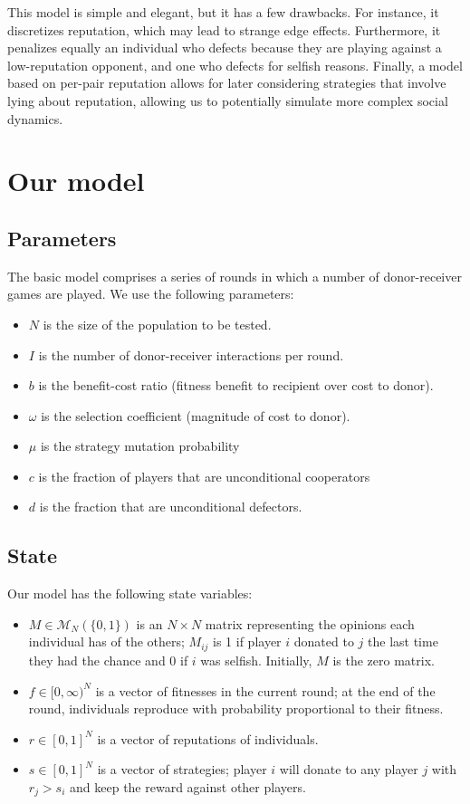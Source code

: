 \documentclass{amsart}
\begin{document}
This model is simple and elegant, but it has a few drawbacks. For
instance, it discretizes reputation, which may lead to strange edge
effects. Furthermore, it penalizes equally an individual who defects
because they are playing against a low-reputation opponent, and one
who defects for selfish reasons. Finally, a model based on per-pair
reputation allows for later considering strategies that involve lying
about reputation, allowing us to potentially simulate more complex
social dynamics.

\section{Our model}
\label{sec:model}

\subsection{Parameters}

The basic model comprises a series of rounds in which a number of
donor-receiver games are played. We use the following parameters:

\begin{itemize}
\item $N$ is the size of the population to be tested.
\item $I$ is the number of donor-receiver interactions per round.
\item $b$ is the benefit-cost ratio (fitness benefit to recipient over
  cost to donor).
\item $\omega$ is the selection coefficient (magnitude of cost to
  donor).
\item $\mu$ is the strategy mutation probability
\item $c$ is the fraction of players that are unconditional
  cooperators
\item $d$ is the fraction that are unconditional defectors.
\end{itemize}

\subsection{State}

Our model has the following state variables:

\begin{itemize}
\item $M \in \mathcal{M}_N(\{0,1\})$ is an $N \times N$ matrix
  representing the opinions each individual has of the others;
  $M_{ij}$ is 1 if player $i$ donated to $j$ the last time they had
  the chance and 0 if $i$ was selfish. Initially, $M$ is the zero
  matrix.
\item $f \in [0, \infty)^N$ is a vector of fitnesses in the current
  round; at the end of the round, individuals reproduce with
  probability proportional to their fitness.
\item $r \in [0,1]^N$ is a vector of reputations of individuals.
\item $s \in [0,1]^N$ is a vector of strategies; player $i$ will
  donate to any player $j$ with $r_j > s_i$ and keep the reward
  against other players.
\end{itemize}
\end{document}
